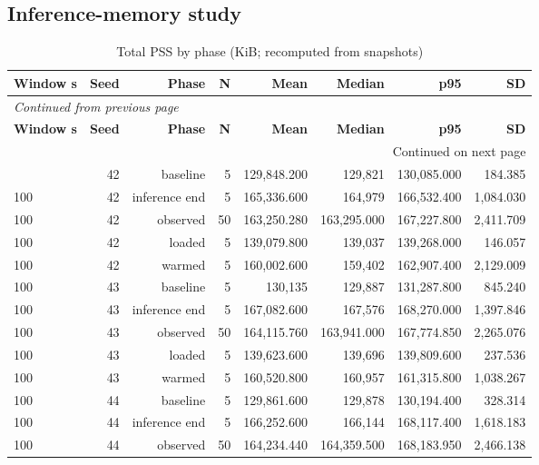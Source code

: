 \documentclass[10pt,a4paper]{article}
\begin{document}
\subsection{Inference-memory study}
\begingroup\small\setlength{\tabcolsep}{4pt}\renewcommand{\arraystretch}{1.12}
\begin{longtable}{@{}lrrrrrrr@{}}
\caption{Total PSS by phase (KiB; recomputed from snapshots)}\\
\toprule
\textbf{Window s} & \textbf{Seed} & \textbf{Phase} & \textbf{N} & \textbf{Mean} & \textbf{Median} & \textbf{p95} & \textbf{SD} \\
\midrule\endfirsthead
\multicolumn{8}{l}{\small\itshape Continued from previous page}\\
\toprule
\textbf{Window s} & \textbf{Seed} & \textbf{Phase} & \textbf{N} & \textbf{Mean} & \textbf{Median} & \textbf{p95} & \textbf{SD} \\
\midrule\endhead
\midrule\multicolumn{8}{r}{\small Continued on next page}\\\endfoot
\bottomrule\endlastfoot
100 & 42 & baseline & 5 & 129,848.200 & 129,821 & 130,085.000 & 184.385 \\
100 & 42 & inference end & 5 & 165,336.600 & 164,979 & 166,532.400 & 1,084.030 \\
100 & 42 & observed & 50 & 163,250.280 & 163,295.000 & 167,227.800 & 2,411.709 \\
100 & 42 & loaded & 5 & 139,079.800 & 139,037 & 139,268.000 & 146.057 \\
100 & 42 & warmed & 5 & 160,002.600 & 159,402 & 162,907.400 & 2,129.009 \\
100 & 43 & baseline & 5 & 130,135 & 129,887 & 131,287.800 & 845.240 \\
100 & 43 & inference end & 5 & 167,082.600 & 167,576 & 168,270.000 & 1,397.846 \\
100 & 43 & observed & 50 & 164,115.760 & 163,941.000 & 167,774.850 & 2,265.076 \\
100 & 43 & loaded & 5 & 139,623.600 & 139,696 & 139,809.600 & 237.536 \\
100 & 43 & warmed & 5 & 160,520.800 & 160,957 & 161,315.800 & 1,038.267 \\
100 & 44 & baseline & 5 & 129,861.600 & 129,878 & 130,194.400 & 328.314 \\
100 & 44 & inference end & 5 & 166,252.600 & 166,144 & 168,117.400 & 1,618.183 \\
100 & 44 & observed & 50 & 164,234.440 & 164,359.500 & 168,183.950 & 2,466.138 \\

\end{longtable}
\end{document}
